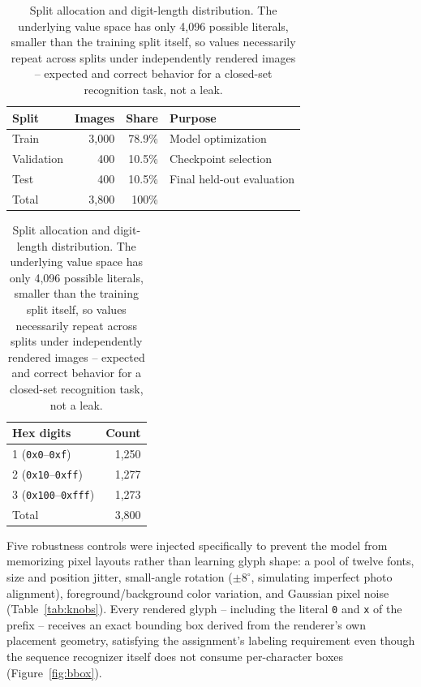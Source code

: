 \documentclass[10pt]{article}
\begin{document}
\begin{table}[H]
\centering
\begin{tabular}{@{}lrrl@{}}
\toprule
\textbf{Split} & \textbf{Images} & \textbf{Share} & \textbf{Purpose} \\
\midrule
Train      & 3,000 & 78.9\% & Model optimization \\
Validation &   400 & 10.5\% & Checkpoint selection \\
Test       &   400 & 10.5\% & Final held-out evaluation \\
\midrule
Total      & 3,800 & 100\% & \\
\bottomrule
\end{tabular}
\qquad
\begin{tabular}{@{}lr@{}}
\toprule
\textbf{Hex digits} & \textbf{Count} \\
\midrule
1 (\texttt{0x0}--\texttt{0xf})   & 1,250 \\
2 (\texttt{0x10}--\texttt{0xff}) & 1,277 \\
3 (\texttt{0x100}--\texttt{0xfff}) & 1,273 \\
\midrule
Total & 3,800 \\
\bottomrule
\end{tabular}
\caption{Split allocation and digit-length distribution. The underlying value space
has only 4{,}096 possible literals, smaller than the training split itself, so values
necessarily repeat across splits under independently rendered images -- expected and
correct behavior for a closed-set recognition task, not a leak.}
\label{tab:data}
\end{table}

Five robustness controls were injected specifically to prevent the model from
memorizing pixel layouts rather than learning glyph shape: a pool of twelve fonts,
size and position jitter, small-angle rotation ($\pm 8^{\circ}$, simulating imperfect
photo alignment), foreground/background color variation, and Gaussian pixel noise
(Table~\ref{tab:knobs}). Every rendered glyph -- including the literal \texttt{0} and
\texttt{x} of the prefix -- receives an exact bounding box derived from the renderer's
own placement geometry, satisfying the assignment's labeling requirement even though the
sequence recognizer itself does not consume per-character boxes (Figure~\ref{fig:bbox}).
\end{document}

